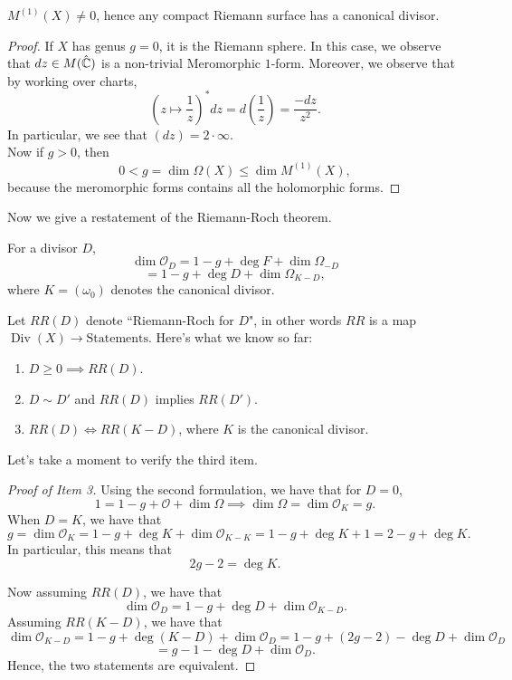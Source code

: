\documentclass{article}
\begin{document}
{\begin{proposition}
    $M^{(1)}(X) \neq 0$, hence any compact Riemann surface has a canonical divisor.
\end{proposition}

\begin{proof}
    If $X$ has genus $g = 0$, it is the Riemann sphere. In this case, we observe that $dz \in M(\hat{\mathbb{C}})$ is a non-trivial Meromorphic $1$-form. Moreover, we observe that by working over charts,
    \[(z \mapsto \frac{1}{z})^* dz = d(\frac{1}{z}) = \frac{-dz}{z^2}.\]
    In particular, we see that $(dz) = 2 \cdot \infty$.\\

    Now if $g > 0$, then 
    \[0 < g = \dim \Omega(X) \leq \dim M^{(1)}(X),\]
    because the meromorphic forms contains all the holomorphic forms.
\end{proof}

Now we give a restatement of the Riemann-Roch theorem.
\begin{theorem}
For a divisor $D$, 
\[\dim \mathcal{O}_D = 1 - g + \deg F + \dim \Omega_{-D} \]
\[= 1 - g + \deg D + \dim \Omega_{K - D},\]
where $K = (\omega_0)$ denotes the canonical divisor.
\end{theorem}

Let $RR(D)$ denote ``Riemann-Roch for $D$", in other words $RR$ is a map $\operatorname{Div}(X) \to \text{Statements}$. Here's what we know so far:
    \begin{enumerate}
        \item $D \geq 0 \implies RR(D)$.
        \item $D \sim D'$ and $RR(D)$ implies $RR(D')$.
        \item $RR(D) \iff RR(K - D)$, where $K$ is the canonical divisor.
    \end{enumerate}
Let's take a moment to verify the third item.

\begin{proof}[Proof of Item 3]
    Using the second formulation, we have that for $D = 0$,
    \[1 = 1 - g + \mathcal{O} + \dim \Omega \implies \dim \Omega = \dim \mathcal{O}_K = g.\]
    When $D = K$, we have that
    \[g = \dim \mathcal{O}_K = 1 - g + \deg K + \dim \mathcal{O}_{K-K} = 1 - g + \deg K + 1 = 2 - g + \deg K.\]
    In particular, this means that
    \[2g - 2 = \deg K.\]

    Now assuming $RR(D)$, we have that
    \[\dim \mathcal{O}_D = 1 - g + \deg D + \dim \mathcal{O}_{K-D}.\]
    Assuming $RR(K-D)$, we have that
    \[\dim \mathcal{O}_{K-D} = 1 - g + \deg(K-D) + \dim \mathcal{O}_D = 1 - g + (2g - 2) - \deg D + \dim \mathcal{O}_D\]
    \[= g - 1 - \deg D + \dim \mathcal{O}_D.\]
    Hence, the two statements are equivalent.
\end{proof}

}
\end{document}
